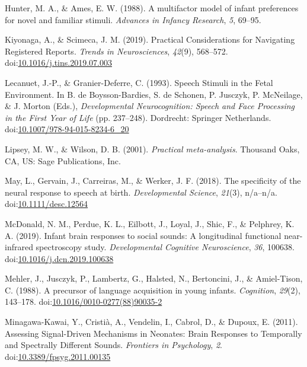 \documentclass[man]{apa6}
\begin{document}
\hypertarget{ref-hunter_multifactor_1988}{}
Hunter, M. A., \& Ames, E. W. (1988). A multifactor model of infant
preferences for novel and familiar stimuli. \emph{Advances in Infancy
Research}, \emph{5}, 69--95.

\hypertarget{ref-kiyonaga_practical_2019}{}
Kiyonaga, A., \& Scimeca, J. M. (2019). Practical Considerations for
Navigating Registered Reports. \emph{Trends in Neurosciences},
\emph{42}(9), 568--572.
doi:\href{https://doi.org/10.1016/j.tins.2019.07.003}{10.1016/j.tins.2019.07.003}

\hypertarget{ref-lecanuet_speech_1993}{}
Lecanuet, J.-P., \& Granier-Deferre, C. (1993). Speech Stimuli in the
Fetal Environment. In B. de Boysson-Bardies, S. de Schonen, P. Jusczyk,
P. McNeilage, \& J. Morton (Eds.), \emph{Developmental Neurocognition:
Speech and Face Processing in the First Year of Life} (pp. 237--248).
Dordrecht: Springer Netherlands.
doi:\href{https://doi.org/10.1007/978-94-015-8234-6_20}{10.1007/978-94-015-8234-6\_20}

\hypertarget{ref-lipsey_practical_2001}{}
Lipsey, M. W., \& Wilson, D. B. (2001). \emph{Practical meta-analysis}.
Thousand Oaks, CA, US: Sage Publications, Inc.

\hypertarget{ref-may_specificity_2018}{}
May, L., Gervain, J., Carreiras, M., \& Werker, J. F. (2018). The
specificity of the neural response to speech at birth.
\emph{Developmental Science}, \emph{21}(3), n/a--n/a.
doi:\href{https://doi.org/10.1111/desc.12564}{10.1111/desc.12564}

\hypertarget{ref-mcdonald_infant_2019}{}
McDonald, N. M., Perdue, K. L., Eilbott, J., Loyal, J., Shic, F., \&
Pelphrey, K. A. (2019). Infant brain responses to social sounds: A
longitudinal functional near-infrared spectroscopy study.
\emph{Developmental Cognitive Neuroscience}, \emph{36}, 100638.
doi:\href{https://doi.org/10.1016/j.dcn.2019.100638}{10.1016/j.dcn.2019.100638}

\hypertarget{ref-mehler_precursor_1988}{}
Mehler, J., Jusczyk, P., Lambertz, G., Halsted, N., Bertoncini, J., \&
Amiel-Tison, C. (1988). A precursor of language acquisition in young
infants. \emph{Cognition}, \emph{29}(2), 143--178.
doi:\href{https://doi.org/10.1016/0010-0277(88)90035-2}{10.1016/0010-0277(88)90035-2}

\hypertarget{ref-minagawa-kawai_assessing_2011}{}
Minagawa-Kawai, Y., Cristià, A., Vendelin, I., Cabrol, D., \& Dupoux, E.
(2011). Assessing Signal-Driven Mechanisms in Neonates: Brain Responses
to Temporally and Spectrally Different Sounds. \emph{Frontiers in
Psychology}, \emph{2}.
doi:\href{https://doi.org/10.3389/fpsyg.2011.00135}{10.3389/fpsyg.2011.00135}
\end{document}
